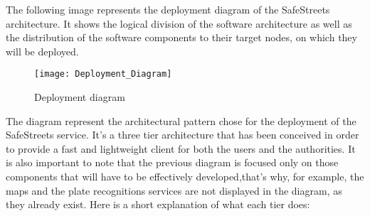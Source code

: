 The following image represents the deployment diagram of the SafeStreets architecture. It shows the logical division of the software architecture as well as the distribution of the software components to their target nodes, on which they will be deployed.

\begin{figure}[H]
  \centering
  \texttt{[image: Deployment\_Diagram]}
  \caption{Deployment diagram}
  \label{fig:deployment_diag}
\end{figure}

The diagram represent the architectural pattern chose for the deployment of the SafeStreets service. It's a three tier architecture that has been conceived in order to provide a fast and lightweight client for both the users and the authorities. 
It is also important to note that the previous diagram is focused only on those components that will have to be effectively developed,that's why, for example, the maps and the plate recognitions services are not displayed in the diagram, as they already exist.
Here is a short explanation of what each tier does:
